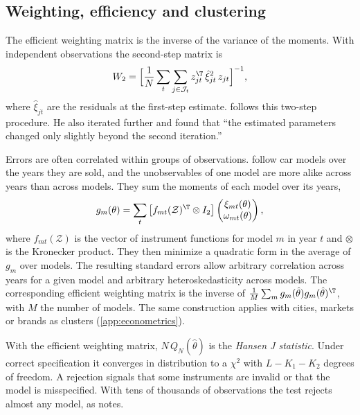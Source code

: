 \subsection{Weighting, efficiency and clustering}\label{sec:08-weighting}

The efficient weighting matrix is the inverse of the variance of the moments. With independent observations
the second-step matrix is
\begin{equation*}
  W_2 = \Big[\frac{1}{N}\sum_t\sum_{j \in \mathcal{J}_t} z_{jt}^\T\,\hat\xi_{jt}^2\, z_{jt}\Big]^{-1},
\end{equation*}
where $\hat\xi_{jt}$ are the residuals at the first-step estimate. \citet[p.~319]{Nevo2001} follows this
two-step procedure. He also iterated further and found that ``the estimated parameters changed only slightly
beyond the second iteration.''

Errors are often correlated within groups of observations. \citet[pp.~862--863]{BerryLevinsohnPakes1995}
follow car models over the years they are sold, and the unobservables of one model are more alike across years
than across models. They sum the moments of each model over its years,
\begin{equation*}
  g_m(\theta) = \sum_t \big[f_{mt}(\mathcal{Z})^\T \otimes I_2\big]
  \begin{pmatrix}\xi_{mt}(\theta)\\ \omega_{mt}(\theta)\end{pmatrix},
\end{equation*}
where $f_{mt}(\mathcal{Z})$ is the vector of instrument functions for model $m$ in year $t$ and $\otimes$ is
the Kronecker product. They then minimize a quadratic form in the average of $g_m$ over models. The
resulting standard errors allow arbitrary correlation across years for a given model and arbitrary
heteroskedasticity across models. The corresponding efficient weighting matrix is the inverse of $\frac{1}{M}
\sum_m g_m(\hat\theta)g_m(\hat\theta)^\T$, with $M$ the number of models. The same construction applies with
cities, markets or brands as clusters (\cref{app:econometrics}).

With the efficient weighting matrix, $N\,Q_N(\hat\theta)$ is the \emph{Hansen J statistic}. Under correct
specification it converges in distribution to a $\chi^2$ with $L - K_1 - K_2$ degrees of freedom. A rejection
signals that some instruments are invalid or that the model is misspecified. With tens of thousands of
observations the test rejects almost any model, as \citet[p.~325, n.~23]{Nevo2001} notes.


